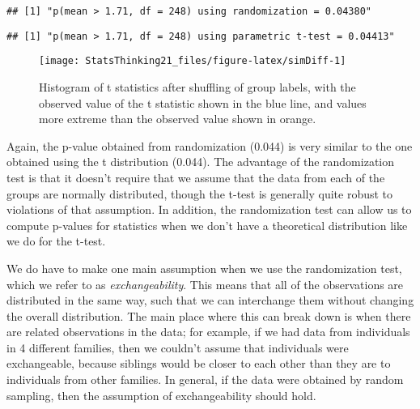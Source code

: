 \documentclass[]{book}
\newenvironment{Shaded}{\begin{snugshade}}{\end{snugshade}}
\newcommand{\KeywordTok}[1]{\textcolor[rgb]{0.13,0.29,0.53}{\textbf{#1}}}
\newcommand{\StringTok}[1]{\textcolor[rgb]{0.31,0.60,0.02}{#1}}
\newcommand{\OperatorTok}[1]{\textcolor[rgb]{0.81,0.36,0.00}{\textbf{#1}}}
\newcommand{\NormalTok}[1]{#1}
\theoremstyle{definition}
\theoremstyle{definition}
\theoremstyle{definition}
\theoremstyle{remark}
\begin{document}
\begin{verbatim}
## [1] "p(mean > 1.71, df = 248) using randomization = 0.04380"
\end{verbatim}

\begin{Shaded}
\end{Shaded}

\begin{verbatim}
## [1] "p(mean > 1.71, df = 248) using parametric t-test = 0.04413"
\end{verbatim}

\begin{figure}
\texttt{[image: StatsThinking21\_files/figure-latex/simDiff-1]} \caption{Histogram of t statistics after shuffling of group labels, with the observed value of the t statistic shown in the blue line, and values more extreme than the observed value shown in orange.}\label{fig:simDiff}
\end{figure}

Again, the p-value obtained from randomization (0.044) is very similar
to the one obtained using the t distribution (0.044). The advantage of
the randomization test is that it doesn't require that we assume that
the data from each of the groups are normally distributed, though the
t-test is generally quite robust to violations of that assumption. In
addition, the randomization test can allow us to compute p-values for
statistics when we don't have a theoretical distribution like we do for
the t-test.

We do have to make one main assumption when we use the randomization
test, which we refer to as \emph{exchangeability}. This means that all
of the observations are distributed in the same way, such that we can
interchange them without changing the overall distribution. The main
place where this can break down is when there are related observations
in the data; for example, if we had data from individuals in 4 different
families, then we couldn't assume that individuals were exchangeable,
because siblings would be closer to each other than they are to
individuals from other families. In general, if the data were obtained
by random sampling, then the assumption of exchangeability should hold.
\end{document}
